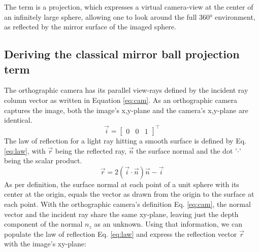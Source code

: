 \documentclass[10pt]{article}
\begin{document}
\begin{multicols}{2}
	The term is a projection, which expresses a virtual camera-view at the center of an infinitely large sphere, allowing one to look around the full 360° environment, as reflected by the mirror surface of the imaged sphere.

	\subsection{Deriving the classical mirror ball projection term}

	The orthographic camera has its parallel view-rays defined by the incident ray column vector as written in Equation \ref{eq:cam}. As an orthographic camera captures the image, both the image's x,y-plane and the camera's x,y-plane are identical.
	\begin{equation}\label{eq:cam}
		\vec{i}=\begin{bmatrix}
			0 & 0 & 1
		\end{bmatrix}^\intercal
	\end{equation}
	The law of reflection for a light ray hitting a smooth surface is defined by Eq. \ref{eq:law}, with $\vec{r}$ being the reflected ray, $\vec{n}$ the surface normal and the dot '$\cdot$' being the scalar product.
	\begin{equation}\label{eq:law}
		\vec{r}=2\left(\vec{i}\cdot\vec{n}\right)\vec{n}-\vec{i}
	\end{equation}
	As per definition, the surface normal at each point of a unit sphere with its center at the origin, equals the vector as drawn from the origin to the surface at each point. With the orthographic camera's definition Eq. \ref{eq:cam}, the normal vector and the incident ray share the same xy-plane, leaving just the depth component of the normal $n_z$ as an unknown. Using that information, we can populate the law of reflection Eq. \ref{eq:law} and express the reflection vector $\vec{r}$ with the image's xy-plane:
	\begin{equation}\label{eq:insert}
			

\end{equation}
\end{multicols}
\end{document}
